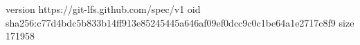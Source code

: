version https://git-lfs.github.com/spec/v1
oid sha256:c77d4bdc5b833b14ff913e85245445a646af09ef0dcc9c0c1be64a1e2717c8f9
size 171958
